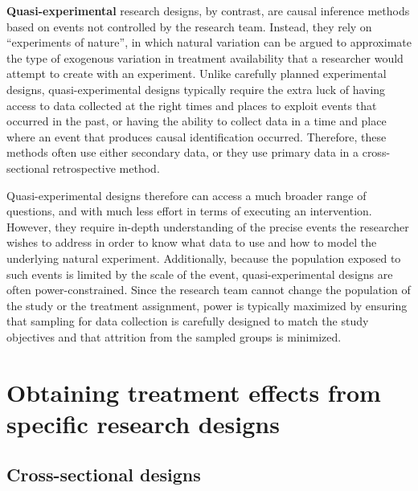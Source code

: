 \textbf{Quasi-experimental} research designs,
by contrast, are causal inference methods based on events not controlled by the research team.
Instead, they rely on ``experiments of nature'',
in which natural variation can be argued to approximate
the type of exogenous variation in treatment availability
that a researcher would attempt to create with an experiment.\cite{dinardo2016natural}
Unlike carefully planned experimental designs,
quasi-experimental designs typically require the extra luck
of having access to data collected at the right times and places
to exploit events that occurred in the past,
or having the ability to collect data in a time and place
where an event that produces causal identification occurred.
Therefore, these methods often use either secondary data,
or they use primary data in a cross-sectional retrospective method.

Quasi-experimental designs therefore can access a much broader range of questions,
and with much less effort in terms of executing an intervention.
However, they require in-depth understanding of the precise events
the researcher wishes to address in order to know what data to use
and how to model the underlying natural experiment.
Additionally, because the population exposed
to such events is limited by the scale of the event,
quasi-experimental designs are often power-constrained.
Since the research team cannot change the population of the study
or the treatment assignment, power is typically maximized by ensuring
that sampling for data collection is carefully designed to match the study objectives
and that attrition from the sampled groups is minimized.

\section{Obtaining treatment effects from specific research designs}


\subsection{Cross-sectional designs}

